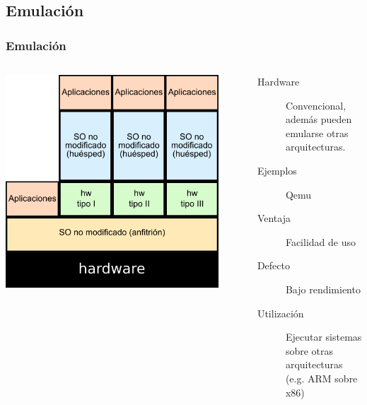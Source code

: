\documentclass{beamer}
\begin{document}
\subsection{Emulación}
\begin{frame} \frametitle{Emulación}
  \begin{columns}
    \begin{center}
    \includegraphics[width=0.9\textwidth]{emulacion.png}      
    \end{center}
    \begin{description}
    \item[Hardware] Convencional, además pueden emularse otras arquitecturas.
    \item[Ejemplos] Qemu
    \item [Ventaja] Facilidad de uso
    \item[Defecto] Bajo rendimiento
    \item[Utilización] Ejecutar sistemas sobre otras arquitecturas
      (e.g. ARM sobre x86)
    \end{description}
  \end{columns}
\end{frame}
\end{document}
